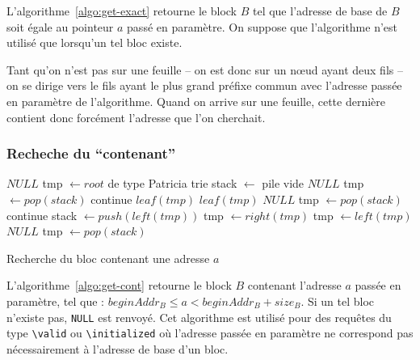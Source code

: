 L'algorithme~\ref{algo:get-exact} retourne le block $B$ tel que l'adresse de
base de $B$ soit égale au pointeur $a$ passé en paramètre.
On suppose que l'algorithme n'est utilisé que lorsqu'un tel bloc existe.

Tant qu'on n'est pas sur une feuille -- on est donc sur un n\oe{}ud ayant deux
fils -- on se dirige vers le fils ayant le plus grand préfixe commun avec
l'adresse passée en paramètre de l'algorithme.
Quand on arrive sur une feuille, cette dernière contient donc forcément
l'adresse que l'on cherchait.

\subsubsection*{Recheche du ``contenant''}

\begin{algorithm}
\begin{algorithmic}
  \Return $NULL$
\Else
  \State tmp $\gets root$ de type Patricia trie
  \State stack $\gets$ pile vide
          \Return $NULL$
        \Else
          \State tmp $\gets pop(stack)$
          \State continue
        \EndIf
        \Return $leaf(tmp)$
        \Return $leaf(tmp)$
        \Return $NULL$
      \Else
        \State tmp $\gets pop(stack)$
        \State continue
      \EndIf
    \EndIf
      \State stack $\gets push(left(tmp))$
      \State tmp $\gets right(tmp)$
      \State tmp $\gets left(tmp)$
      \Return $NULL$
    \Else
      \State tmp $\gets pop(stack)$
    \EndIf
  \EndWhile
\EndIf
\end{algorithmic}
\caption{Recherche du bloc contenant une adresse $a$
  \label{algo:get-cont}}
\end{algorithm}

L'algorithme~\ref{algo:get-cont} retourne le block $B$ contenant
l'adresse $a$ passée en paramètre, tel que :
$beginAddr_B \le a < beginAddr_B + size_B$.
Si un tel bloc n'existe pas, \lstinline{NULL} est renvoyé.
Cet algorithme est utilisé pour des requêtes du type \lstinline{\valid} ou
\lstinline{\initialized} où l'adresse passée en paramètre ne correspond pas
nécessairement à l'adresse de base d'un bloc.

